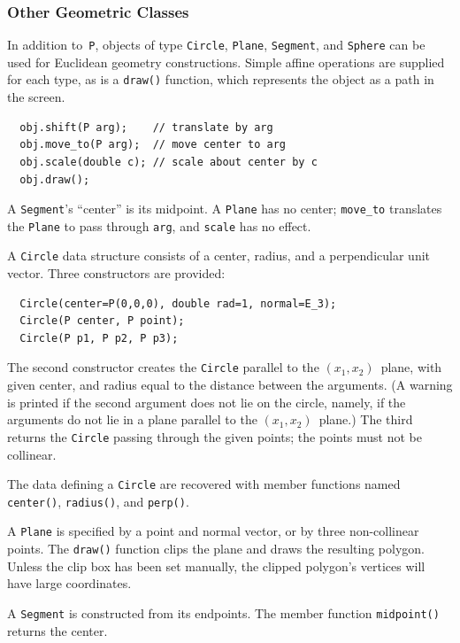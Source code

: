\documentclass[12pt,letterpaper]{book}
\newcommand{\code}[1]{\texttt{#1}}
\newcommand{\teximath}[1]{$#1$}
\newcommand{\findex}[1]{\ignorespaces}
\begin{document}
\subsubsection*{Other Geometric Classes}

In addition to~\code{P}, objects of type \code{Circle}, \code{Plane},
\code{Segment}, and \code{Sphere} can be used for Euclidean geometry
constructions. Simple affine operations are supplied for each type, as
is a \code{draw()} function, which represents the object as a path in
the screen.
\findex{shift}
\findex{move\_to}
\findex{scale}
\findex{draw}
\begin{verbatim}
  obj.shift(P arg);    // translate by arg
  obj.move_to(P arg);  // move center to arg
  obj.scale(double c); // scale about center by c
  obj.draw();
\end{verbatim}
A \code{Segment}'s ``center'' is its midpoint. A \code{Plane} has no
center; \code{move\_to} translates the \code{Plane} to pass through
\code{arg}, and \code{scale} has no effect.

A \code{Circle} data structure consists of a center, radius, and a
perpendicular unit vector. Three constructors are provided:
\findex{Circle}
\begin{verbatim}
  Circle(center=P(0,0,0), double rad=1, normal=E_3);
  Circle(P center, P point);
  Circle(P p1, P p2, P p3);
\end{verbatim}
The second constructor creates the \code{Circle} parallel to the
\teximath{(x_1,x_2)}~plane, with given center, and radius equal to the distance
between the arguments. (A warning is printed if the second argument
does not lie on the circle, namely, if the arguments do not lie in a
plane parallel to the \teximath{(x_1,x_2)}~plane.) The third returns the
\code{Circle} passing through the given points; the points must not be
collinear.

The data defining a \code{Circle} are recovered with member functions
named \code{center()}, \code{radius()}, and \code{perp()}.

\findex{Plane}
A \code{Plane} is specified by a point and normal vector, or by three
non-collinear points. The \code{draw()} function clips the plane and
draws the resulting polygon. Unless the clip box has been set
manually, the clipped polygon's vertices will have large coordinates.

\findex{Segment}
A \code{Segment} is constructed from its endpoints. The member
function \code{midpoint()} returns the center.
\end{document}

